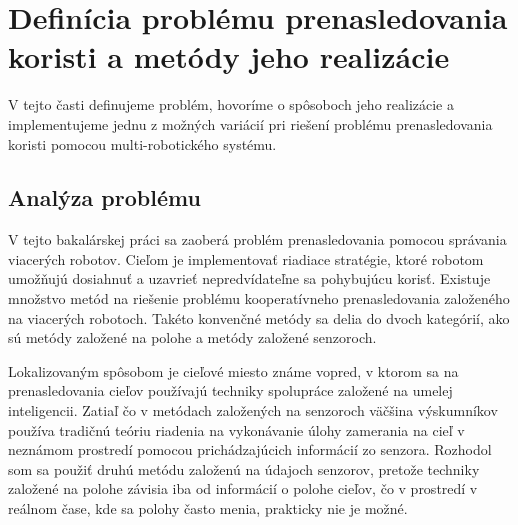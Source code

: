 
\section{Definícia problému prenasledovania koristi a metódy jeho realizácie}
V tejto časti definujeme problém, hovoríme o spôsoboch jeho realizácie a implementujeme jednu z možných variácií pri riešení problému prenasledovania koristi pomocou multi-robotického systému.

\subsection{Analýza problému}
V tejto bakalárskej práci sa zaoberá problém prenasledovania pomocou správania viacerých robotov. Cieľom je implementovať riadiace stratégie, ktoré robotom umožňujú dosiahnuť a uzavrieť nepredvídateľne sa pohybujúcu korisť. Existuje množstvo metód
na riešenie problému kooperatívneho prenasledovania založeného na viacerých robotoch. Takéto konvenčné metódy sa delia do
dvoch kategórií, ako sú metódy založené na polohe a metódy založené senzoroch.

\vspace{3mm}

\justifying
\noindent
Lokalizovaným spôsobom je cieľové miesto známe vopred, v ktorom sa na prenasledovania cieľov používajú techniky spolupráce založené
na umelej inteligencii. Zatiaľ čo v metódach
založených na senzoroch väčšina výskumníkov používa tradičnú teóriu riadenia na vykonávanie úlohy zamerania na cieľ v
neznámom prostredí pomocou prichádzajúcich informácií zo senzora. Rozhodol som sa použiť druhú metódu založenú na
údajoch senzorov, pretože techniky založené na polohe závisia iba od informácií o polohe cieľov, čo v prostredí v
reálnom čase, kde sa polohy často menia, prakticky nie je možné.

\vspace{3mm}

